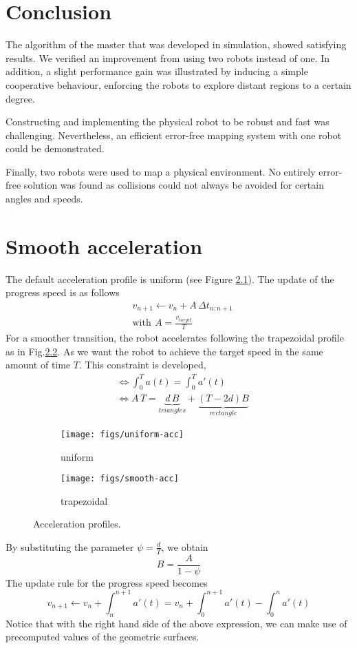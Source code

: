 \documentclass[12pt]{report}
\begin{document}
\chapter{Conclusion}\label{conclusion}
The algorithm of the master that was developed in simulation, showed satisfying results. We verified an improvement from using two robots instead of one. In addition, a slight performance gain was illustrated by inducing a simple cooperative behaviour, enforcing the robots to explore distant regions to a certain degree.

Constructing and implementing the physical robot to be robust and fast was challenging. Nevertheless, an efficient error-free mapping system with one robot could be demonstrated.

Finally, two robots were used to map a physical environment. No entirely error-free solution was found as collisions could not always be avoided for certain angles and speeds.




\newpage
\appendix
\chapter{Smooth acceleration}\label{chap-extra}
The default acceleration profile is uniform (see Figure \ref{fig:a}). The update of the progress speed is as follows
\begin{align*}
&v_{n+1} \leftarrow v_n + A \, \Delta t_{n:n+1}\\
&\text{with}\,\ A = \frac{v_{target}}{T}
\end{align*}
For a smoother transition, the robot accelerates following the trapezoidal profile as in Fig.\ref{fig:b}. As we want the robot to achieve the target speed in the same amount of time $T$. This constraint is developed,
\begin{align*}
&\Leftrightarrow \int_{0}^{T}a(t) =  \int_{0}^{T}a'(t) \\
&\Leftrightarrow A\,T = \underbrace{d\,B}_{triangles} + \underbrace{(T - 2d)B}_{rectangle}
\end{align*}
\begin{figure}[!h]
\centering
\begin{subfigure}{.5\textwidth}
  \centering
  \texttt{[image: figs/uniform-acc]}
  \caption{uniform}
  \label{fig:a}
\end{subfigure}%
\begin{subfigure}{.5\textwidth}
  \centering
  \texttt{[image: figs/smooth-acc]}
  \caption{trapezoidal}
  \label{fig:b}
\end{subfigure}
\caption{Acceleration profiles.}
\label{fig:ab}
\end{figure}
By substituting the parameter $\psi = \frac{d}{T}$, we obtain
$$
\boxed{B = \frac{A}{1-\psi}} 
$$
The update rule for the progress speed becomes
$$
v_{n+1} \leftarrow v_n + \int_{n}^{n+1}a'(t) = v_n + \int_{0}^{n+1}a'(t) - \int_{0}^{n}a'(t)
$$
Notice that with the right hand side of the above expression, we can make use of precomputed values of the geometric surfaces.
\end{document}
